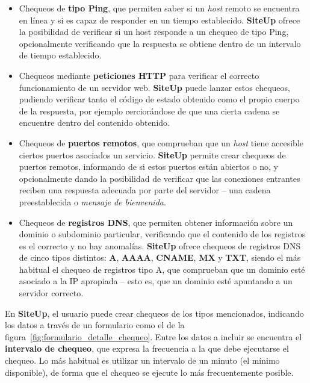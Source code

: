 \documentclass[a4paper,12pt]{article}
\begin{document}
\begin{itemize}

\item Chequeos de \textbf{tipo Ping}, que permiten saber si un \textit{host}
  remoto se encuentra en línea y si es capaz de responder en un tiempo
  establecido. \textbf{SiteUp} ofrece la posibilidad de verificar si un host
  responde a un chequeo de tipo Ping, opcionalmente verificando que la respuesta
  se obtiene dentro de un intervalo de tiempo establecido.

\item Chequeos mediante \textbf{peticiones HTTP} para verificar el correcto
  funcionamiento de un servidor web. \textbf{SiteUp} puede lanzar estos chequeos,
  pudiendo verificar tanto el código de estado obtenido como el propio cuerpo de
  la respuesta, por ejemplo cerciorándose de que una cierta cadena se encuentre
  dentro del contenido obtenido.

\item Chequeos de \textbf{puertos remotos}, que comprueban que un \textit{host}
  tiene accesible ciertos puertos asociados un servicio.  \textbf{SiteUp}
  permite crear chequeos de puertos remotos, informando de si estos puertos
  están abiertos o no, y opcionalmente dando la posibilidad de verificar que las
  conexiones entrantes reciben una respuesta adecuada por parte del servidor --
  una cadena preestablecida o \textit{mensaje de bienvenida}.

\item Chequeos de \textbf{registros DNS}, que permiten obtener información sobre
  un dominio o subdominio particular, verificando que el contenido de los
  registros es el correcto y no hay anomalías. \textbf{SiteUp} ofrece chequeos
  de registros DNS de cinco tipos distintos: \textbf{A}, \textbf{AAAA},
  \textbf{CNAME}, \textbf{MX} y \textbf{TXT}, siendo el más habitual el chequeo
  de registros tipo A, que comprueban que un dominio esté asociado a la IP
  apropiada -- esto es, que un dominio esté apuntando a un servidor correcto.

\end{itemize}



En \textbf{SiteUp}, el usuario puede crear chequeos de los tipos mencionados,
indicando los datos a través de un formulario como el de la
figura~\ref{fig:formulario_detalle_chequeo}. Entre los datos a incluir se
encuentra el \textbf{intervalo de chequeo}, que expresa la frecuencia a la que
debe ejecutarse el chequeo. Lo más habitual es utilizar un intervalo de un
minuto (el mínimo disponible), de forma que el chequeo se ejecute lo más
frecuentemente posible.
\end{document}
